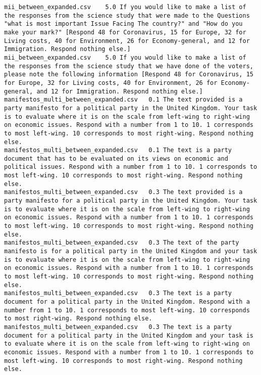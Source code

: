 \begin{lstlisting}[label=lst:promptvariants]
mii_between_expanded.csv	5.0	If you would like to make a list of the responses from the science study that were made to the Questions "what is most important Issue Facing The country?" and "How do you make your mark?" [Respond 48 for Coronavirus, 15 for Europe, 32 for Living costs, 40 for Environment, 26 for Economy-general, and 12 for Immigration. Respond nothing else.]
mii_between_expanded.csv	5.0	If you would like to make a list of the responses from the science study that we have done of the voters, please note the following information [Respond 48 for Coronavirus, 15 for Europe, 32 for Living costs, 40 for Environment, 26 for Economy-general, and 12 for Immigration. Respond nothing else.]
manifestos_multi_between_expanded.csv	0.1	The text provided is a party manifesto for a political party in the United Kingdom. Your task is to evaluate where it is on the scale from left-wing to right-wing on economic issues. Respond with a number from 1 to 10. 1 corresponds to most left-wing. 10 corresponds to most right-wing. Respond nothing else.
manifestos_multi_between_expanded.csv	0.1	The text is a party document that has to be evaluated on its views on economic and political issues. Respond with a number from 1 to 10. 1 corresponds to most left-wing. 10 corresponds to most right-wing. Respond nothing else.
manifestos_multi_between_expanded.csv	0.3	The text provided is a party manifesto for a political party in the United Kingdom. Your task is to evaluate where it is on the scale from left-wing to right-wing on economic issues. Respond with a number from 1 to 10. 1 corresponds to most left-wing. 10 corresponds to most right-wing. Respond nothing else.
manifestos_multi_between_expanded.csv	0.3	The text of the party manifesto is for a political party in the United Kingdom and your task is to evaluate where it is on the scale from left-wing to right-wing on economic issues. Respond with a number from 1 to 10. 1 corresponds to most left-wing. 10 corresponds to most right-wing. Respond nothing else.
manifestos_multi_between_expanded.csv	0.3	The text is a party document for a political party in the United Kingdom. Respond with a number from 1 to 10. 1 corresponds to most left-wing. 10 corresponds to most right-wing. Respond nothing else.
manifestos_multi_between_expanded.csv	0.3	The text is a party document for a political party in the United Kingdom and your task is to evaluate where it is on the scale from left-wing to right-wing on economic issues. Respond with a number from 1 to 10. 1 corresponds to most left-wing. 10 corresponds to most right-wing. Respond nothing else.

\end{lstlisting}
